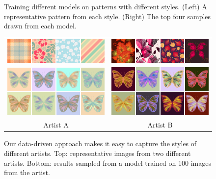 \begin{figure}[t!]
\caption{Training different models on patterns with different styles. (Left) A representative pattern from each style. (Right) The top four samples drawn from each model.}
\label{fig:styleTraining}
\vspace{-1.0em}
\end{figure}

\begin{figure}[ht]
\centering
\begin{tabular}{cc} 
\includegraphics[width=.44\linewidth]{figs/styleSugarExamples2}&\includegraphics[width=.44\linewidth]{figs/styleAlbenajExamples2}\vspace{1.0em}\\
\includegraphics[width=.44\linewidth]{figs/styleSugar2}&\includegraphics[width=.44\linewidth]{figs/styleAlbenaj2}\\
Artist A&Artist B\\
\end{tabular}

\caption{Our data-driven approach makes it easy to capture the styles of different artists. Top: representative images from two different artists. Bottom: results sampled from a model trained on 100 images from the artist.}
\vspace{-1.0em}
\label{fig:artistTraining}
\end{figure}

